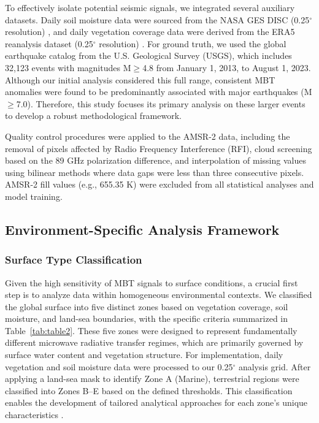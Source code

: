 \documentclass[preprint,review,12pt,authoryear]{elsarticle}
\begin{document}
To effectively isolate potential seismic signals, we integrated several auxiliary datasets. Daily soil moisture data were sourced from the NASA GES DISC (0.25$^{\circ}$ resolution) \citep{fangGlobalLandData2009}, and daily vegetation coverage data were derived from the ERA5 reanalysis dataset (0.25$^{\circ}$ resolution) \citep{hersbachERA5GlobalReanalysis2020,munoz-sabaterERA5landStateoftheartGlobal2021}. For ground truth, we used the global earthquake catalog from the U.S. Geological Survey (USGS), which includes 32,123 events with magnitudes M$\ge$4.8 from January 1, 2013, to August 1, 2023. Although our initial analysis considered this full range, consistent MBT anomalies were found to be predominantly associated with major earthquakes (M$\ge$7.0). Therefore, this study focuses its primary analysis on these larger events to develop a robust methodological framework.

Quality control procedures were applied to the AMSR-2 data, including the removal of pixels affected by Radio Frequency Interference (RFI), cloud screening based on the 89 GHz polarization difference, and interpolation of missing values using bilinear methods where data gaps were less than three consecutive pixels. AMSR-2 fill values (e.g., 655.35 K) were excluded from all statistical analyses and model training.

\subsection{Environment-Specific Analysis Framework}\label{sec:env_framework}

\subsubsection{Surface Type Classification}\label{sec:surface_classification}
Given the high sensitivity of MBT signals to surface conditions, a crucial first step is to analyze data within homogeneous environmental contexts. We classified the global surface into five distinct zones based on vegetation coverage, soil moisture, and land-sea boundaries, with the specific criteria summarized in Table~\ref{tab:table2}. These five zones were designed to represent fundamentally different microwave radiative transfer regimes, which are primarily governed by surface water content and vegetation structure. For implementation, daily vegetation and soil moisture data were processed to our 0.25$^{\circ}$ analysis grid. After applying a land-sea mask to identify Zone A (Marine), terrestrial regions were classified into Zones B--E based on the defined thresholds. This classification enables the development of tailored analytical approaches for each zone's unique characteristics \citep{oweMethodologySurfaceSoil2001}.
\end{document}
